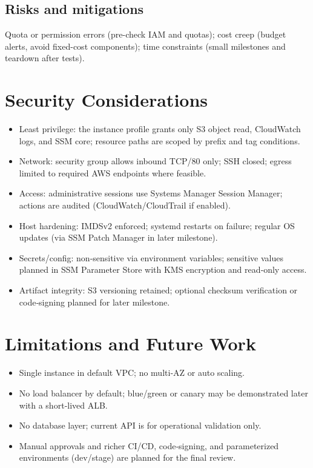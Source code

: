 \documentclass[12pt]{article}
\begin{document}
\subsection{Risks and mitigations}
Quota or permission errors (pre-check IAM and quotas); cost creep (budget alerts, avoid fixed-cost components); time constraints (small milestones and teardown after tests).

\section{Security Considerations}\label{sec:security}
\begin{itemize}
\item Least privilege: the instance profile grants only S3 object read, CloudWatch logs, and SSM core; resource paths are scoped by prefix and tag conditions.
\item Network: security group allows inbound TCP/80 only; SSH closed; egress limited to required AWS endpoints where feasible.
\item Access: administrative sessions use Systems Manager Session Manager; actions are audited (CloudWatch/CloudTrail if enabled).
\item Host hardening: IMDSv2 enforced; systemd restarts on failure; regular OS updates (via SSM Patch Manager in later milestone).
\item Secrets/config: non‑sensitive via environment variables; sensitive values planned in SSM Parameter Store with KMS encryption and read‑only access.
\item Artifact integrity: S3 versioning retained; optional checksum verification or code‑signing planned for later milestone.
\end{itemize}

\section{Limitations and Future Work}\label{sec:limitations}
\begin{itemize}
\item Single instance in default VPC; no multi‑AZ or auto scaling.
\item No load balancer by default; blue/green or canary may be demonstrated later with a short‑lived ALB.
\item No database layer; current API is for operational validation only.
\item Manual approvals and richer CI/CD, code‑signing, and parameterized environments (dev/stage) are planned for the final review.
\end{itemize}
\end{document}
